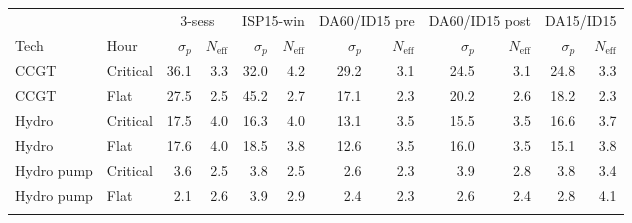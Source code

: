 \begin{tabular}{l l r r r r r r r r r r }
\toprule
 & & \multicolumn{2}{c}{3-sess} & \multicolumn{2}{c}{ISP15-win} & \multicolumn{2}{c}{DA60/ID15 pre} & \multicolumn{2}{c}{DA60/ID15 post} & \multicolumn{2}{c}{DA15/ID15} \\
Tech & Hour & $\sigma_p$ & $N_{\text{eff}}$ & $\sigma_p$ & $N_{\text{eff}}$ & $\sigma_p$ & $N_{\text{eff}}$ & $\sigma_p$ & $N_{\text{eff}}$ & $\sigma_p$ & $N_{\text{eff}}$ \\
\midrule
CCGT & Critical & 36.1 & 3.3 & 32.0 & 4.2 & 29.2 & 3.1 & 24.5 & 3.1 & 24.8 & 3.3 \\
CCGT & Flat & 27.5 & 2.5 & 45.2 & 2.7 & 17.1 & 2.3 & 20.2 & 2.6 & 18.2 & 2.3 \\
\addlinespace
Hydro & Critical & 17.5 & 4.0 & 16.3 & 4.0 & 13.1 & 3.5 & 15.5 & 3.5 & 16.6 & 3.7 \\
Hydro & Flat & 17.6 & 4.0 & 18.5 & 3.8 & 12.6 & 3.5 & 16.0 & 3.5 & 15.1 & 3.8 \\
\addlinespace
Hydro pump & Critical & 3.6 & 2.5 & 3.8 & 2.5 & 2.6 & 2.3 & 3.9 & 2.8 & 3.8 & 3.4 \\
Hydro pump & Flat & 2.1 & 2.6 & 3.9 & 2.9 & 2.4 & 2.3 & 2.6 & 2.4 & 2.8 & 4.1 \\
\addlinespace
\bottomrule
\end{tabular}